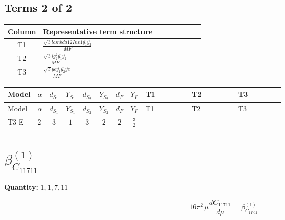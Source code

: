 \documentclass[8pt]{article}
\begin{document}
\begin{landscape}
\subsection*{Terms 2 of 2}
\begin{center}
\begin{tabular}{@{}c >{\raggedright\arraybackslash}p{0.82\linewidth}@{}}
\toprule
Column & Representative term structure \\
\midrule
T1 & \(\displaystyle \frac{\sqrt{3} lambda12Inv1 \overline{y_{1}} \overline{y_{2}}}{MF}\) \\
\midrule
T2 & \(\displaystyle \frac{\sqrt{3} i g_{2}^{2} \overline{y_{1}} \overline{y_{2}}}{MF}\) \\
\midrule
T3 & \(\displaystyle \frac{\sqrt{3} ye \overline{y_{1}} \overline{y_{2}} \overline{ye}}{MF}\) \\
\midrule
\bottomrule
\end{tabular}
\end{center}
\smallskip
\tiny
\begin{longtable}{@{}llcccccc >{\raggedright\arraybackslash}p{0.21\linewidth} >{\raggedright\arraybackslash}p{0.21\linewidth} >{\raggedright\arraybackslash}p{0.21\linewidth}@{}}
\toprule
Model & $\alpha$ & $d_{S_1}$ & $Y_{S_1}$ & $d_{S_2}$ & $Y_{S_2}$ & $d_F$ & $Y_F$ & T1 & T2 & T3 \\
\midrule
\endfirsthead
\toprule
Model & $\alpha$ & $d_{S_1}$ & $Y_{S_1}$ & $d_{S_2}$ & $Y_{S_2}$ & $d_F$ & $Y_F$ & T1 & T2 & T3 \\
\midrule
\endhead
T3-E & $2$ & $3$ & $1$ & $3$ & $2$ & $2$ & $\frac{3}{2}$ & \scriptsize\adjustbox{max width=\linewidth}{$\begin{gathered} \frac{\sqrt{3} lambda12Inv1 \overline{y_{1}} \overline{y_{2}}}{6 MF}\end{gathered}$} & \scriptsize\adjustbox{max width=\linewidth}{$\begin{gathered} - \frac{\sqrt{3} i g_{2}^{2} \overline{y_{1}} \overline{y_{2}}}{6 MF}\end{gathered}$} & \scriptsize\adjustbox{max width=\linewidth}{$\begin{gathered} \frac{\sqrt{3} ye \overline{y_{1}} \overline{y_{2}} \overline{ye}}{12 MF}\end{gathered}$} \\
\midrule
\bottomrule
\end{longtable}
\clearpage
\section*{$\beta_{C_{11711}}^{(1)}$}
\noindent\textbf{Quantity: }$\mathrm{1,1,7,11}$\par\smallskip
\[16\pi^2\,\mu\frac{d C_{11711}}{d\mu}=\beta_{C_{11711}}^{(1)}\]

\end{landscape}
\end{document}

